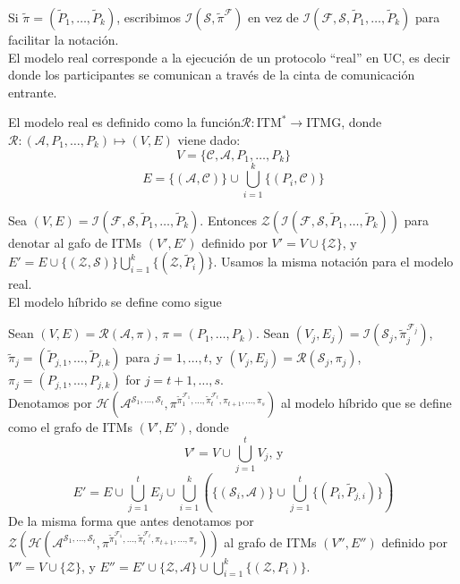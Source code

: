 Si $\tilde{\pi} = (\tilde{P}_1, \ldots, \tilde{P}_k)$, escribimos
$\mathcal{I}(\mathcal{S}, \tilde{\pi}^\mathcal{F})$ en vez de $\mathcal{I}(\mathcal{F},
\mathcal{S}, \tilde{P}_1, \ldots, \tilde{P}_k)$ para facilitar la notación.\\

El modelo real corresponde a la ejecución de un protocolo ``real'' en UC, es decir
donde los participantes se comunican a través de la cinta de comunicación entrante.

\begin{definicion}
El modelo real es definido como la función$\mathcal{R}:\textrm{ITM}^* \to \textrm{ITMG}$,
donde $\mathcal{R}:(\mathcal{A}, P_1, \ldots, P_k) \mapsto (V, E)$ viene dado:
$$V = \{\mathcal{C}, \mathcal{A}, P_1, \ldots, P_k\}$$
$$E = \{(\mathcal{A}, \mathcal{C})\}\cup\bigcup_{i=1}^k\{(P_i, \mathcal{C})\}$$
\end{definicion}

Sea $(V, E) = \mathcal{I}(\mathcal{F}, \mathcal{S}, \tilde{P}_1, \ldots, \tilde{P}_k)$.
Entonces $\mathcal{Z}(\mathcal{I}(\mathcal{F}, \mathcal{S}, \tilde{P}_1, \ldots,
\tilde{P}_k))$ para denotar al gafo de ITMs $(V', E')$ definido por $V' = V \cup \{\mathcal{Z}\}$,
y $E' = E \cup \{(\mathcal{Z}, \mathcal{S})\} \bigcup_{i=1}^k \{(\mathcal{Z}, \tilde{P}_i)\}$.
Usamos la misma notación para el modelo real.\\

El modelo híbrido se define como sigue

\begin{definicion}
Sean
$(V, E) = \mathcal{R}(\mathcal{A}, \pi)$, $\pi = (P_1, \ldots, P_k)$.
Sean $(V_j, E_j) =
\mathcal{I}(\mathcal{S}_j,
            \tilde{\pi}^{\mathcal{F}_j}_j)$,
$\tilde{\pi}_j = (\tilde{P}_{j, 1}, \ldots, \tilde{P}_{j, k})$ para $j = 1, \ldots, t$,
y $(V_j, E_j) = \mathcal{R}(\mathcal{S}_j,\pi_j)$,
$\pi_j = (P_{j, 1}, \ldots, P_{j, k})$ for $j = t+1, \ldots, s$.\\
Denotamos por
$\mathcal{H}(
    \mathcal{A}^{
        \mathcal{S}_1,
        \ldots,
        \mathcal{S}_t},
    \pi^{
        \tilde{\pi}_1^{\mathcal{F}_1},
        \ldots,
        \tilde{\pi}_t^{\mathcal{F}_t},
        \pi_{t+1},
        \ldots,
        \pi_s})$
al modelo híbrido que se define como el grafo de ITMs $(V', E')$, donde
$$V' = V \cup \bigcup_{j=1}^t V_j \textrm{, y}$$
$$E' = 
    E
    \cup
    \bigcup_{j=1}^t E_j
    \cup
    \bigcup_{i=1}^k
        \left(
            \{(\mathcal{S}_i, \mathcal{A})\}
            \cup
            \bigcup_{j=1}^t \{(P_i, \tilde{P}_{j, i})\}
        \right)$$
De la misma forma que antes denotamos por
$\mathcal{Z}(
    \mathcal{H}(
        \mathcal{A}^{
            \mathcal{S}_1,
            \ldots,
            \mathcal{S}_t},
        \pi^{
            \tilde{\pi}_1^{\mathcal{F}_1},
            \ldots,
            \tilde{\pi}_t^{\mathcal{F}_t},
            \pi_{t+1},
            \ldots,
            \pi_s}))$
al grafo de ITMs $(V'', E'')$ definido por
$V'' = V \cup \{\mathcal{Z}\}$,
y
$E'' = 
    E'
    \cup
    \{\mathcal{Z}, \mathcal{A}\}
    \cup 
    \bigcup_{i=1}^k \{(\mathcal{Z}, P_i)\}$.
\end{definicion}

